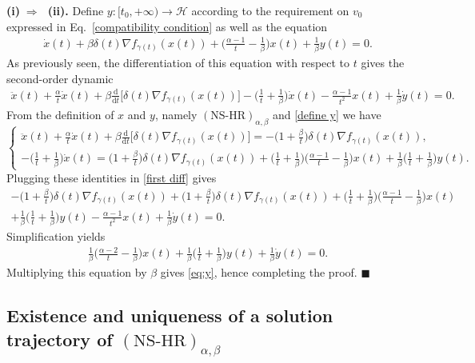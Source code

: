 \documentclass[11pt]{article}
\numberwithin{equation}{section}
\newenvironment{proof}{\bigskip\noindent{\bf Proof.}}{\hfill $\blacksquare$ \par\bigskip\noindent}
\begin{document}
\begin{proof}
\noindent\textbf{(i)$\;\Rightarrow\;$ (ii).}
Define $y:[t_0,+\infty) \longrightarrow \mathcal{H}$ according to the requirement on $v_0$ expressed in Eq.~\eqref{compatibility condition} as well as the equation 
\begin{align}
\label{define y}
    \dot{x}(t)+\beta\delta(t)\nabla f_{\gamma(t)}(x(t))+\Big(\frac{\alpha-1}{t}-\frac{1}{\beta}\Big)x(t)+\frac{1}{\beta}y(t)=0.
\end{align}
As previously seen, the differentiation of this equation with respect to $t$ gives the second-order dynamic
\begin{align}
\label{first diff}
    \ddot{x}(t)+\frac{\alpha}{t}\dot{x}(t)+\beta\frac{\mathrm{d}}{\mathrm{d}t}\Big[\delta(t)\nabla f_{\gamma(t)}(x(t))\Big]-\Big(\frac{1}{t}+\frac{1}{\beta}\Big)\dot{x}(t)-\frac{\alpha-1}{t^2}x(t)+\frac{1}{\beta}\dot{y}(t)=0.
\end{align}
From the definition of $x$ and $y$, namely $(\text{NS-HR})_{\alpha,\beta}$ and \eqref{define y} we have 
$$
\begin{cases}
    \ddot{x}(t)+\frac{\alpha}{t}\dot{x}(t)+\beta\frac{\mathrm{d}}{\mathrm{d}t}\Big[\delta(t)\nabla f_{\gamma(t)}(x(t))\Big]=-\Big(1+\frac{\beta}{t}\Big)\delta(t)\nabla f_{\gamma(t)}(x(t)),\\
    -\Big(\frac{1}{t}+\frac{1}{\beta}\Big)\dot{x}(t)=\Big(1+\frac{\beta}{t}\Big)\delta(t)\nabla f_{\gamma(t)}(x(t))+\Big(\frac{1}{t}+\frac{1}{\beta}\Big)\Big(\frac{\alpha-1}{t}-\frac{1}{\beta}\Big)x(t)+\frac{1}{\beta}\Big(\frac{1}{t}+\frac{1}{\beta}\Big)y(t).
\end{cases}
$$
Plugging these identities in \eqref{first diff} gives
\begin{align*}
-\Big(1+\frac{\beta}{t}\Big)\delta(t)\nabla f_{\gamma(t)}(x(t))+\Big(1+\frac{\beta}{t}\Big)\delta(t)\nabla f_{\gamma(t)}(x(t))+\Big(\frac{1}{t}+\frac{1}{\beta}\Big)\Big(\frac{\alpha-1}{t}-\frac{1}{\beta}\Big)x(t)\\+\frac{1}{\beta}\Big(\frac{1}{t}+\frac{1}{\beta}\Big)y(t)-\frac{\alpha-1}{t^2}x(t)+\frac{1}{\beta}\dot{y}(t)=0.
\end{align*}
Simplification yields
\begin{align*}
 \frac{1}{\beta}\Big(\frac{\alpha-2}{t}-\frac{1}{\beta}\Big)x(t)+\frac{1}{\beta}\Big(\frac{1}{t}+\frac{1}{\beta}\Big)y(t)+\frac{1}{\beta}\dot{y}(t)=0.
\end{align*}
Multiplying this equation by $\beta$ gives \eqref{eq:y}, hence completing the proof. 
\end{proof}
\subsection{Existence and uniqueness of a solution trajectory of $(\text{NS-HR})_{\alpha,\beta}$}
\end{document}
